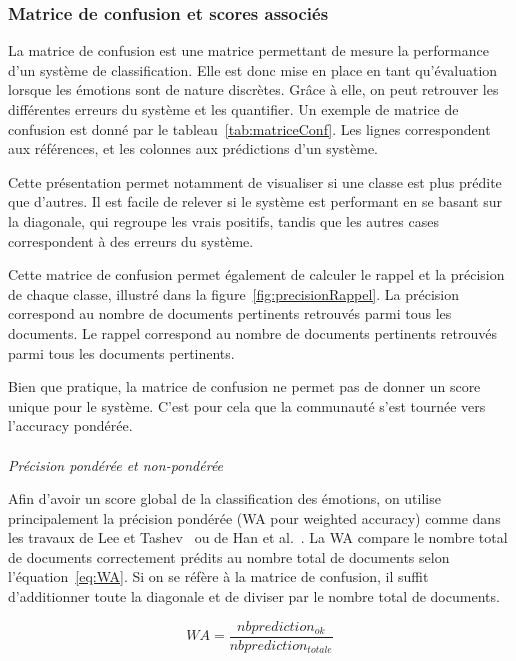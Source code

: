 \subsubsection{Matrice de confusion et scores associés}
La matrice de confusion est une matrice permettant de mesure la performance d'un système de classification. Elle est donc mise en place en tant qu'évaluation lorsque les émotions sont de nature discrètes. Grâce à elle, on peut retrouver les différentes erreurs du système et les quantifier. Un exemple de matrice de confusion est donné par le tableau~\ref{tab:matriceConf}. Les lignes correspondent aux références, et les colonnes aux prédictions d'un système.




Cette présentation permet notamment de visualiser si une classe est plus prédite que d'autres. Il est facile de relever si le système est performant en se basant sur la diagonale, qui regroupe les vrais positifs, tandis que les autres cases correspondent à des erreurs du système.

Cette matrice de confusion permet également de calculer le rappel et la précision de chaque classe, illustré dans la figure~\ref{fig:precisionRappel}. La précision correspond au nombre de documents pertinents retrouvés parmi tous les documents. Le rappel correspond au nombre de documents pertinents retrouvés parmi tous les documents pertinents.

Bien que pratique, la matrice de confusion ne permet pas de donner un score unique pour le système. C'est pour cela que la communauté s'est tournée vers l'accuracy pondérée.
\\
\\
\textit{Précision pondérée et non-pondérée}

Afin d'avoir un score global de la classification des émotions, on utilise principalement la précision pondérée (WA pour weighted accuracy) comme dans les travaux de Lee et Tashev~\cite{Lee2015} ou de Han et al.~\cite{Han2014}.
La WA compare le nombre total de documents correctement prédits au nombre total de documents selon l'équation~\ref{eq:WA}. Si on se réfère à la matrice de confusion, il suffit d'additionner toute la diagonale et de diviser par le nombre total de documents.

\begin{equation}
  WA = \frac{nb  prediction_{ok}}{nb  prediction_{totale}}
  \label{eq:WA}
\end{equation}

